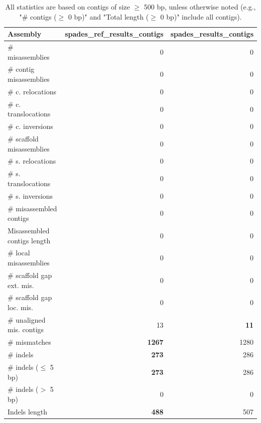 \documentclass[12pt,a4paper]{article}
\begin{document}
\begin{table}[ht]
\begin{center}
\caption{All statistics are based on contigs of size $\geq$ 500 bp, unless otherwise noted (e.g., "\# contigs ($\geq$ 0 bp)" and "Total length ($\geq$ 0 bp)" include all contigs).}
\begin{tabular}{|l*{2}{|r}|}
\hline
Assembly & spades\_ref\_results\_contigs & spades\_results\_contigs \\ \hline
\# misassemblies & 0 & 0 \\ \hline
\hspace{2mm}\# contig misassemblies & 0 & 0 \\ \hline
\hspace{5mm}\# c. relocations & 0 & 0 \\ \hline
\hspace{5mm}\# c. translocations & 0 & 0 \\ \hline
\hspace{5mm}\# c. inversions & 0 & 0 \\ \hline
\hspace{2mm}\# scaffold misassemblies & 0 & 0 \\ \hline
\hspace{5mm}\# s. relocations & 0 & 0 \\ \hline
\hspace{5mm}\# s. translocations & 0 & 0 \\ \hline
\hspace{5mm}\# s. inversions & 0 & 0 \\ \hline
\# misassembled contigs & 0 & 0 \\ \hline
Misassembled contigs length & 0 & 0 \\ \hline
\# local misassemblies & 0 & 0 \\ \hline
\# scaffold gap ext. mis. & 0 & 0 \\ \hline
\# scaffold gap loc. mis. & 0 & 0 \\ \hline
\# unaligned mis. contigs & 13 & {\bf 11} \\ \hline
\# mismatches & {\bf 1267} & 1280 \\ \hline
\# indels & {\bf 273} & 286 \\ \hline
\hspace{5mm}\# indels ($\leq$ 5 bp) & {\bf 273} & 286 \\ \hline
\hspace{5mm}\# indels ($>$ 5 bp) & 0 & 0 \\ \hline
Indels length & {\bf 488} & 507 \\ \hline
\end{tabular}
\end{center}
\end{table}
\end{document}
